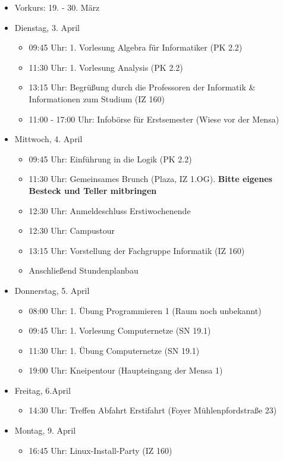 \begin{itemize}
	\item Vorkurs: 19. - 30. März
	\item Dienstag, 3. April
	\begin{itemize}
		\item 09:45 Uhr: 1. Vorlesung Algebra für Informatiker (PK 2.2)
		\item 11:30 Uhr: 1. Vorlesung Analysis (PK 2.2)
		\item 13:15 Uhr: Begrüßung durch die Professoren der Informatik \& Informationen zum Studium (IZ 160)
		\item 11:00 - 17:00 Uhr: Infobörse für Erstsemester (Wiese vor der Mensa)
	\end{itemize}
	\item Mittwoch, 4. April
	\begin{itemize}
		\item 09:45 Uhr: Einführung in die Logik (PK 2.2)
		\item 11:30 Uhr: Gemeinsames Brunch (Plaza, IZ 1.OG). \textbf{Bitte eigenes Besteck und Teller mitbringen}
		\item 12:30 Uhr: Anmeldeschluss Erstiwochenende
		\item 12:30 Uhr: Campustour
		\item 13:15 Uhr: Vorstellung der Fachgruppe Informatik (IZ 160)
		\item Anschließend Stundenplanbau
	\end{itemize}
	\item Donnerstag, 5. April
	\begin{itemize}
		\item 08:00 Uhr: 1. Übung Programmieren 1 (Raum noch unbekannt)
		\item 09:45 Uhr: 1. Vorlesung Computernetze (SN 19.1)
		\item 11:30 Uhr: 1. Übung Computernetze (SN 19.1)
		\item 19:00 Uhr: Kneipentour (Haupteingang der Mensa 1)
	\end{itemize}
	\item Freitag, 6.April
	\begin{itemize}
		\item 14:30 Uhr: Treffen Abfahrt Erstifahrt (Foyer Mühlenpfordstraße 23)
	\end{itemize}
	\item Montag, 9. April
	\begin{itemize}
		\item 16:45 Uhr: Linux-Install-Party (IZ 160)
	\end{itemize}

\end{itemize}
